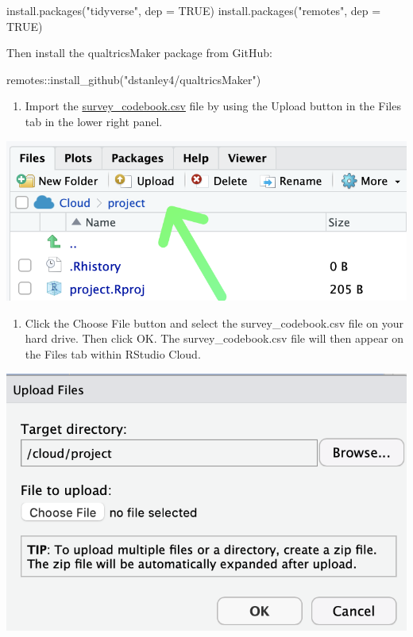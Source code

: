 \documentclass[
]{krantz}
\makeatletter
\newenvironment{Shaded}{\begin{snugshade}}{\end{snugshade}}
\newcommand{\AttributeTok}[1]{\textcolor[rgb]{0.61,0.61,0.61}{#1}}
\newcommand{\ConstantTok}[1]{\textcolor[rgb]{0,0,0}{#1}}
\newcommand{\FunctionTok}[1]{\textcolor[rgb]{0,0,0}{#1}}
\newcommand{\NormalTok}[1]{#1}
\newcommand{\SpecialCharTok}[1]{\textcolor[rgb]{0,0,0}{#1}}
\newcommand{\StringTok}[1]{\textcolor[rgb]{0.5,0.5,0.5}{#1}}
\providecommand{\tightlist}{%
  \setlength{\itemsep}{0pt}\setlength{\parskip}{0pt}}
\newenvironment{kframe}{%
\medskip{}
\setlength{\fboxsep}{.8em}
 \def\at@end@of@kframe{}%
 \ifinner\ifhmode%
  \def\at@end@of@kframe{\end{minipage}}%
  \begin{minipage}{\columnwidth}%
 \fi\fi%
 \def\FrameCommand##1{\hskip\@totalleftmargin \hskip-\fboxsep
 \colorbox{shadecolor}{##1}\hskip-\fboxsep
     \hskip-\linewidth \hskip-\@totalleftmargin \hskip\columnwidth}%
 \MakeFramed {\advance\hsize-\width
   \@totalleftmargin\z@ \linewidth\hsize
   \@setminipage}}%
 {\par\unskip\endMakeFramed%
 \at@end@of@kframe}
\renewenvironment{Shaded}{\begin{kframe}}{\end{kframe}}
\makeatother
\begin{document}
\begin{Shaded}
\begin{Highlighting}[]
\FunctionTok{install.packages}\NormalTok{(}\StringTok{"tidyverse"}\NormalTok{, }\AttributeTok{dep =} \ConstantTok{TRUE}\NormalTok{)}
\FunctionTok{install.packages}\NormalTok{(}\StringTok{"remotes"}\NormalTok{, }\AttributeTok{dep =} \ConstantTok{TRUE}\NormalTok{)}
\end{Highlighting}
\end{Shaded}

Then install the qualtricsMaker package from GitHub:

\begin{Shaded}
\begin{Highlighting}[]
\NormalTok{remotes}\SpecialCharTok{::}\FunctionTok{install\_github}\NormalTok{(}\StringTok{"dstanley4/qualtricsMaker"}\NormalTok{)}
\end{Highlighting}
\end{Shaded}

\begin{enumerate}
\def\labelenumi{\arabic{enumi}.}
\setcounter{enumi}{3}
\tightlist
\item
  Import the \url{survey_codebook.csv} file by using the Upload button in the Files tab in the lower right panel.
\end{enumerate}

\includegraphics[width=0.5\linewidth]{ch_qualtrics/images/screenshot_import_button}

\begin{enumerate}
\def\labelenumi{\arabic{enumi}.}
\setcounter{enumi}{4}
\tightlist
\item
  Click the Choose File button and select the survey\_codebook.csv file on your hard drive. Then click OK. The survey\_codebook.csv file will then appear on the Files tab within RStudio Cloud.
\end{enumerate}

\includegraphics[width=0.5\linewidth]{ch_qualtrics/images/screenshot_choose_file}
\end{document}
